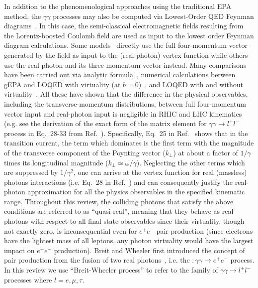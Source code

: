 \documentclass[12pt,epjc3]{svjour3}\sloppy
\begin{document}
In addition to the phenomenological approaches using the traditional EPA method, the $\gamma\gamma$ processes may also be computed via Lowest-Order QED Feynman diagrams~\cite{hencken_electromagnetic_1994,Hencken:1995me,zhaInitialTransversemomentumBroadening2020b,liImpactParameterDependence2020}. 
In this case, the semi-classical electromagnetic fields resulting from the Lorentz-boosted Coulomb field are used as input to the lowest order Feynman diagram calculations. 
Some models~\cite{hencken_electromagnetic_1994,zhaInitialTransversemomentumBroadening2020b} directly use the full four-momentum vector generated by the field as input to the (real photon) vertex function while others~\cite{PhysRevC.47.2308,liImpactParameterDependence2020} use the real-photon and its three-momentum vector instead. 
Many comparisons have been carried out via analytic formula~\cite{PhysRevC.47.2308}, numerical calculations between gEPA and LOQED with virtuality (at $b=0$)~\cite{hencken_electromagnetic_1994}, and LOQED with and without virtuality~\cite{zhaInitialTransversemomentumBroadening2020b,liImpactParameterDependence2020}. All these have shown that the difference in the physical observables, including the transverse-momentum distributions, between full four-momentum vector input and real-photon input is negligible in RHIC and LHC kinematics (e.g. see the derivation of the exact form of the matrix element for $\gamma\gamma \rightarrow l^+l^-$ process in Eq.~28-33 from Ref.~\cite{hencken_electromagnetic_1994}). 
Specifically, Eq.~25 in Ref.~\cite{PhysRevC.47.2308} shows that in the transition current, the term which dominates is the first term with the magnitude of the transverse component of the Poynting vector ($k_\perp$) at about a factor of $1/\gamma$ times its longitudinal magnitude  ($k_\perp\simeq\omega/\gamma$). 
Neglecting the other terms which are suppressed by $1/\gamma^2$, one can arrive at the vertex function for real (massless) photons interactions  (i.e. Eq.~28 in Ref.~\cite{PhysRevC.47.2308}) and can consequently justify the real-photon approximation for all the physics observables in the specified kinematic range. Throughout this review, the colliding photons that satisfy the above conditions are referred to as ``quasi-real'', meaning that they behave as real photons with respect to all final state observables since their virtuality, though not exactly zero, is inconsequential even for $e^+e^-$ pair production (since electrons have the lightest mass of all leptons, any photon virtuality would have the largest impact on $e^+e^-$ production). Breit and Wheeler first introduced the concept of pair production from the fusion of two real photons~\cite{Breit-wheeler1934zz}, i.e. the $:\gamma\gamma \rightarrow e^+e^-$ process. In this review we use ``Breit-Wheeler process'' to refer to the family of $\gamma\gamma \rightarrow l^+l^-$ processes where $l=e, \mu, \tau$. 
\end{document}
